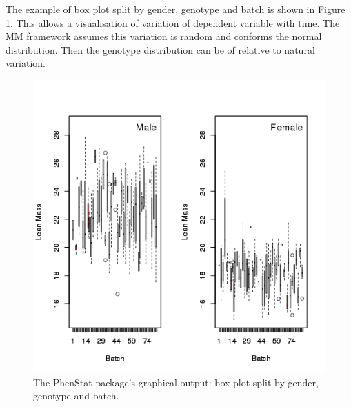 \documentclass[12pt,a4paper]{article}
\begin{document}
The example of box plot split by gender, genotype and batch is shown in Figure \ref{fig:07}. This allows a visualisation of variation of dependent variable with time. The MM framework assumes this variation is random and conforms the normal distribution. Then the genotype distribution can be of relative to natural variation. 
\begin{figure}[!htpb]%
\centerline{\includegraphics[scale=0.5]{boxplotGenderGenotypeBatch.png}}
\caption{The PhenStat package's graphical output: box plot split by gender, genotype and batch.}\label{fig:07}
\end{figure}
\end{document}

